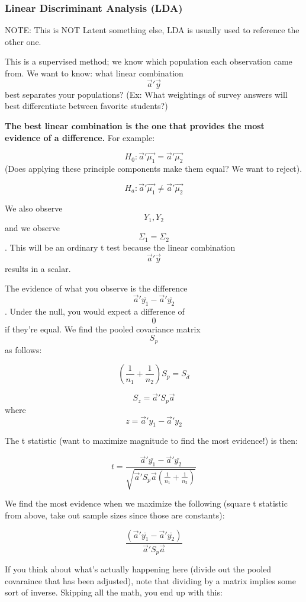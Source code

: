 \hypertarget{linear-discriminant-analysis-lda}{%
\subsubsection{Linear Discriminant Analysis
(LDA)}\label{linear-discriminant-analysis-lda}}

NOTE: This is NOT Latent something else, LDA is usually used to
reference the other one.

This is a supervised method; we know which population each observation
came from. We want to know: what linear combination \[\vec{a}'\vec{y}\]
best separates your populations? (Ex: What weightings of survey answers
will best differentiate between favorite students?)

\textbf{The best linear combination is the one that provides the most
evidence of a difference.} For example:

\[H_0: \vec{a}'\vec{\mu_1} = \vec{a}'\vec{\mu_2}\] (Does applying these
principle components make them equal? We want to reject).

\[H_a: \vec{a}'\vec{\mu_1} \ne \vec{a}'\vec{\mu_2}\]

We also observe \[Y_1, Y_2\] and we observe \[\Sigma_1 = \Sigma_2\].
This will be an ordinary t test because the linear combination
\[\vec{a}'\vec{y}\] results in a scalar.

The evidence of what you observe is the difference
\[\vec{a}'\bar{y_1} - \vec{a}'\bar{y_2}\]. Under the null, you would
expect a difference of \[0\] if they're equal. We find the pooled
covariance matrix \[S_p\] as follows:

\[(\frac{1}{n_1} + \frac{1}{n_2})S_p = S_\bar{d}\]

\[S_z = \vec{a}'S_p\vec{a}\] where \[z = \vec{a}'y_1 - \vec{a}'y_2\]

The t statistic (want to maximize magnitude to find the most evidence!)
is then:

\[t = \frac{\vec{a}'\bar{y_1} - \vec{a}'\bar{y_2}}{\sqrt{\vec{a}'S_p\vec{a}(\frac{1}{n_1} + \frac{1}{n_2})}}\]

We find the most evidence when we maximize the following (square t
statistic from above, take out sample sizes since those are constants):

\[\frac{(\vec{a}'\bar{y_1} - \vec{a}'\bar{y_2})}{\vec{a}'S_p\vec{a}}\]

If you think about what's actually happening here (divide out the pooled
covaraince that has been adjusted), note that dividing by a matrix
implies some sort of inverse. Skipping all the math, you end up with
this:

